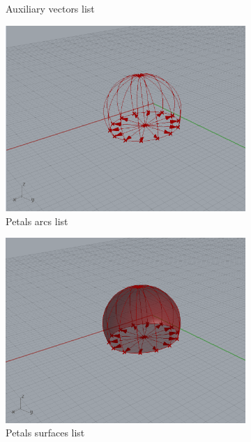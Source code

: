\documentclass[preprint,12pt,3p]{elsarticle}
\begin{document}
\begin{figure}
\begin{subfigure}{0.3\textwidth}
  \caption{Auxiliary vectors list}
  \label{fig:a02s06}
\end{subfigure}


\begin{subfigure}{0.3\textwidth}
  \centering
  \includegraphics[width=.9\linewidth]{a02s07.png}
  \caption{Petals arcs list}
  \label{fig:a02s07}
\end{subfigure}
\begin{subfigure}{0.3\textwidth}
  \centering
  \includegraphics[width=.9\linewidth]{a02s08.png}
  \caption{Petals surfaces list}
  \label{fig:a02s08}
\end{subfigure}
\begin{subfigure}{0.3\textwidth}
  \centering

\end{subfigure}
\end{figure}
\end{document}
